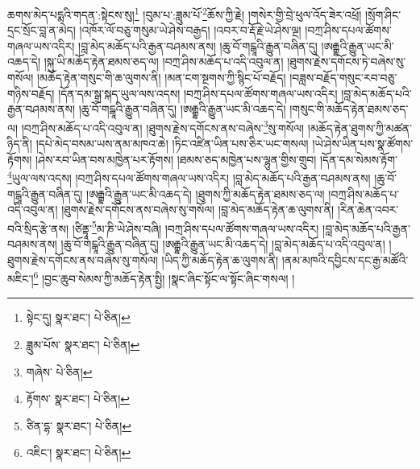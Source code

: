 ཆགས་མེད་པདྨའི་གདན་:སྟེངས་སུ།\footnote{སྟེང་དུ།  སྣར་ཐང་།  པེ་ཅིན། } །བུམ་པ་:ཟླུམ་པོ་\footnote{ཟླུམ་པོས་  སྣར་ཐང་།  པེ་ཅིན། }ཆོས་ཀྱི་རྗེ། །གསེར་གྱི་བྲེ་ཕུལ་འོད་ཟེར་འཕྲོ། །སྲོག་ཤིང་དྲང་སྲོང་བླ་ན་མེད། །འཁོར་ལོ་བཅུ་གསུམ་ཡེ་ཤེས་བརྒྱད། །འབར་བ་རྡོ་རྗེ་ཡེ་ཤེས་ལྔ། །བཀྲ་ཤིས་དཔལ་ཚོགས་གཞལ་ཡས་འདིར། །བླ་མེད་མཆོད་པའི་རྒྱན་བཤམས་ནས། །ཆུ་བོ་གངྒཱའི་རྒྱུན་བཞིན་དུ། །ཨརྒྷའི་རྒྱུན་ཡང་མི་འཆད་དེ། །སྐུ་ཡི་མཆོད་རྟེན་ཐམས་ཅད་ལ། །བཀྲ་ཤིས་མཆོད་པ་འདི་འབུལ་ན། །ཐུགས་རྗེས་དགོངས་ཏེ་བཞེས་སུ་གསོལ། །མཆོད་རྟེན་གསུང་གི་ཆ་ལུགས་ནི། །མན་ངག་སྔགས་ཀྱི་སྙིང་པོ་བརྗོད། །བཟླས་བརྗོད་གསུང་རབ་བཅུ་གཉིས་བརྗོད། །དོན་དམ་སྒྲ་སྐད་ཡུལ་ལས་འདས། །བཀྲ་ཤིས་དཔལ་ཚོགས་གཞལ་ཡས་འདིར། །བླ་མེད་མཆོད་པའི་རྒྱན་བཤམས་ནས། །ཆུ་བོ་གངྒཱའི་རྒྱུན་བཞིན་དུ། །ཨརྒྷའི་རྒྱུན་ཡང་མི་འཆད་དེ། །གསུང་གི་མཆོད་རྟེན་ཐམས་ཅད་ལ། །བཀྲ་ཤིས་མཆོད་པ་འདི་འབུལ་ན། །ཐུགས་རྗེས་དགོངས་ནས་བཞེས་\footnote{གཞེས་  པེ་ཅིན། }སུ་གསོལ། །མཆོད་རྟེན་ཐུགས་ཀྱི་མཚན་ཉིད་ནི། །དཔེ་མེད་བསམ་ཡས་ནམ་མཁའ་ཆེ། །ཏིང་འཛིན་ཡིན་པས་ཅིར་ཡང་གསལ། །ཡེ་ཤེས་ཡིན་པས་སྣ་ཚོགས་རྟོགས། །ཤེས་རབ་ཡིན་བས་མཁྱེན་པར་རྟོགས། །ཐམས་ཅད་མཁྱེན་པས་ལྷུན་གྱིས་གྲུབ། །དོན་དམ་སེམས་རྟོག་\footnote{རྟོགས་  སྣར་ཐང་།  པེ་ཅིན། }ཡུལ་ལས་འདས། །བཀྲ་ཤིས་དཔལ་ཚོགས་གཞལ་ཡས་འདིར། །བླ་མེད་མཆོད་པའི་རྒྱན་བཤམས་ནས། །ཆུ་བོ་གངྒཱའི་རྒྱུན་བཞིན་དུ། །ཨརྒྷའི་རྒྱུན་ཡང་མི་འཆད་དེ། །ཐུགས་ཀྱི་མཆོད་རྟེན་ཐམས་ཅད་ལ། །བཀྲ་ཤིས་མཆོད་པ་འདི་འབུལ་ན། །ཐུགས་རྗེས་དགོངས་ནས་བཞེས་སུ་གསོལ། །བླ་མེད་མཆོད་རྟེན་ཆ་ལུགས་ནི། །རིན་ཆེན་འབར་བའི་སྲིད་རྩེ་ནས། །ཙིནྟཱ་\footnote{ཙིན་དྷ་  སྣར་ཐང་།  པེ་ཅིན། }མ་ཎི་ཡེ་ཤེས་བཞི། །བཀྲ་ཤིས་དཔལ་ཚོགས་གཞལ་ཡས་འདིར། །བླ་མེད་མཆོད་པའི་རྒྱན་བཤམས་ནས། །ཆུ་བོ་གངྒཱའི་རྒྱུན་བཞིན་དུ། །ཨརྒྷའི་རྒྱུན་ཡང་མི་འཆད་དེ། །བླ་མེད་མཆོད་པ་འདི་འབུལ་ན། །ཐུགས་རྗེས་དགོངས་ནས་བཞེས་སུ་གསོལ། །ཡིད་ཀྱི་མཆོད་རྟེན་ཆ་ལུགས་ནི། །ནམ་མཁའི་དབྱིངས་དང་རྒྱ་མཚོའི་མཇིང་།\footnote{འཇིང་།  སྣར་ཐང་།  པེ་ཅིན། } །བྱང་ཆུབ་སེམས་ཀྱི་མཆོད་རྟེན་སྤྱི། །སྣང་ཞིང་སྟོང་ལ་སྟོང་ཞིང་གསལ། །
